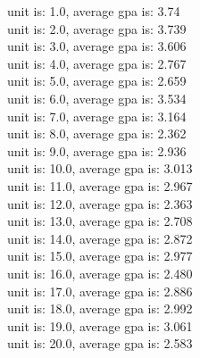 unit is: 1.0, average gpa is: 3.74\\
unit is: 2.0, average gpa is: 3.739\\
unit is: 3.0, average gpa is: 3.606\\
unit is: 4.0, average gpa is: 2.767\\
unit is: 5.0, average gpa is: 2.659\\
unit is: 6.0, average gpa is: 3.534\\
unit is: 7.0, average gpa is: 3.164\\
unit is: 8.0, average gpa is: 2.362\\
unit is: 9.0, average gpa is: 2.936\\
unit is: 10.0, average gpa is: 3.013\\
unit is: 11.0, average gpa is: 2.967\\
unit is: 12.0, average gpa is: 2.363\\
unit is: 13.0, average gpa is: 2.708\\
unit is: 14.0, average gpa is: 2.872\\
unit is: 15.0, average gpa is: 2.977\\
unit is: 16.0, average gpa is: 2.480\\
unit is: 17.0, average gpa is: 2.886\\
unit is: 18.0, average gpa is: 2.992\\
unit is: 19.0, average gpa is: 3.061\\
unit is: 20.0, average gpa is: 2.583\\

